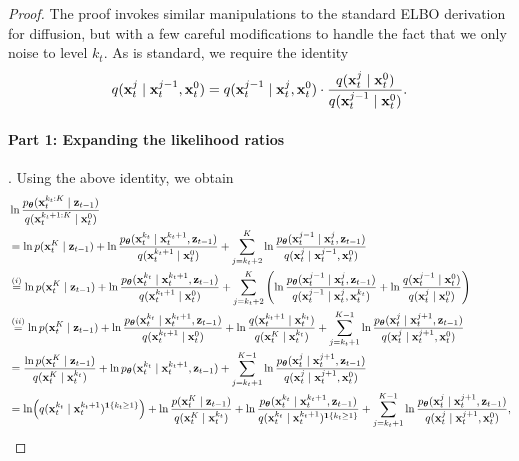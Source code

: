 \begin{proof}
The proof invokes similar manipulations to the standard ELBO derivation for diffusion, but with a few careful modifications to handle the fact that we only noise to level $k_t$. As is standard, we  require the identity 
\begin{align}
q(\mathbf{x}_{t}^{j} \mid \mathbf{x}_t^{j-1},\mathbf{x}_t^0) = q(\mathbf{x}_{t}^{j-1} \mid \mathbf{x}_t^{j},\mathbf{x}_t^0) \cdot \frac{q(\mathbf{x}_{t}^{j} \mid \mathbf{x}_t^0)}{q(\mathbf{x}_{t}^{j-1} \mid  \mathbf{x}_t^0)}. \label{eq:time_reversal}
\end{align}
\paragraph{Part 1: Expanding the likelihood ratios}.  Using the above identity, we obtain
\begin{align*}
&\ln \frac{ \ptheta(\bx_{t}^{k_t:K} \mid \bz_{t-1})}{q(\bx_t^{k_t+1:K} \mid \bx^{0}_t)} \\
&= \ln  p (\bx_t^{K} \mid \bz_{t-1}) + \ln \frac{\ptheta(\bx_t^{k_t} \mid \bx_{t}^{k_t+1},\bz_{t-1})}{q(\bx_{t}^{k_t+1} \mid \bx_t^{0})} + \sum_{j=k_{t}+2}^{K}\ln \frac{\ptheta(\bx_{t}^{j-1} \mid \bx_{t}^{j},\bz_{t-1})}{q(\bx_{t}^{j} \mid \bx_t^{j-1},\bx_t^{0})}\\
&\overset{(i)}{=} \ln  p (\bx_t^{K}\mid \bz_{t-1}) + \ln \frac{\ptheta(\bx_t^{k_t} \mid \bx_{t}^{k_t+1},\bz_{t-1})}{q(\bx_{t}^{k_t+1} \mid  \bx_t^{0})} + \sum_{j=k_{t}+2}^{K}\left(\ln \frac{\ptheta(\bx_{t}^{j-1} \mid \bx_{t}^{j},\bz_{t-1})}{q(\bx_{t}^{j-1} \mid \bx_t^{j},\bx_t^{k_t})} + \ln \frac{q(\bx_{t}^{j-1} \mid \bx_t^{0})}{q(\bx_{t}^{j} \mid \bx_t^{0})}\right)\\
&\overset{(ii)}{=} \ln  p (\bx_t^{K}\mid \bz_{t-1}) + \ln \frac{\ptheta(\bx_t^{k_t} \mid \bx_{t}^{k_t+1},  \bz_{t-1})}{q(\bx_{t}^{k_t+1} \mid  \bx_t^{0})} + \ln \frac{q(\bx_{t}^{k_t+1} \mid \bx_t^{k_t})}{q(\bx_{t}^{K} \mid \bx_t^{k_t})} + \sum_{j=k_{t}+1}^{K-1}\ln \frac{\ptheta(\bx_{t}^{j} \mid \bx_{t}^{j+1}, \bz_{t-1})}{q(\bx_{t}^{j} \mid \bx_t^{j+1},\bx_t^0)} \\
&= \frac{\ln  p (\bx_t^{K}\mid \bz_{t-1})}{q(\bx_{t}^{K} \mid \bx_t^{k_t})} + \ln \ptheta(\bx_t^{k_t} \mid \bx_{t}^{k_t+1},  \bz_{t-1})  + \sum_{j=k_{t}+1}^{K-1}\ln \frac{\ptheta(\bx_{t}^{j} \mid \bx_{t}^{j+1}, \bz_{t-1})}{q(\bx_{t}^{j} \mid \bx_t^{j+1},\bx_t^0)} \\
&= \ln (q(\bx_t^{k_t} \mid \bx_{t}^{k_t+1})^{\I\{k_t \ge 1\}})  + 
\ln\frac{  p (\bx_t^{K}\mid \bz_{t-1})}{q(\bx_{t}^{K} \mid \bx_t^{k_t})} + \ln \frac{\ptheta(\bx_t^{k_t} \mid \bx_{t}^{k_t+1},  \bz_{t-1})}{q(\bx_t^{k_t} \mid \bx_{t}^{k_t+1})^{\I\{k_t \ge 1\}}}  + \sum_{j=k_{t}+1}^{K-1}\ln \frac{\ptheta(\bx_{t}^{j} \mid \bx_{t}^{j+1}, \bz_{t-1})}{q(\bx_{t}^{j} \mid \bx_t^{j+1},\bx_t^0)},

\end{align*}
\end{proof}
